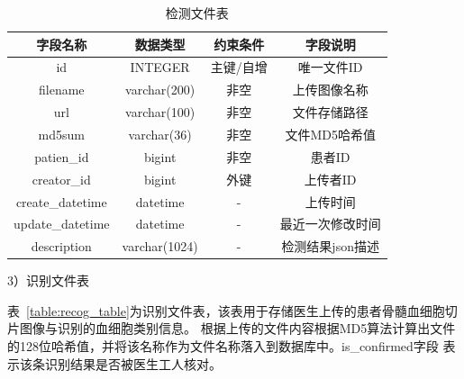\begin{table}
    \caption{检测文件表}   
    \centering 
    \label{table:detect_table}
    \begin{tabular*}{0.9\hsize}{@{}@{\extracolsep{\fill}}cccc@{}}
      \toprule[1pt]
      字段名称  &  数据类型 & 约束条件 & 字段说明 \\
      \midrule[1pt] 
      id           & INTEGER      & 主键/自增    & 唯一文件ID   \\ 
      filename     & varchar(200) & 非空         & 上传图像名称   \\ 
      url          & varchar(100) & 非空         & 文件存储路径   \\ 
      md5sum       & varchar(36)  & 非空         & 文件MD5哈希值 \\
      patien\_id   & bigint       & 非空         & 患者ID  \\ 
      creator\_id  & bigint       & 外键         & 上传者ID  \\ 
      create\_datetime & datetime & -    & 上传时间 \\
      update\_datetime & datetime & -    & 最近一次修改时间 \\
      description      & varchar(1024) & - & 检测结果json描述 \\
      \bottomrule[1pt]      
    \end{tabular*} 
  \end{table}

3）识别文件表

表~\ref{table:recog_table}为识别文件表，该表用于存储医生上传的患者骨髓血细胞切片图像与识别的血细胞类别信息。
根据上传的文件内容根据MD5算法计算出文件的128位哈希值，并将该名称作为文件名称落入到数据库中。is\_confirmed字段
表示该条识别结果是否被医生工人核对。

